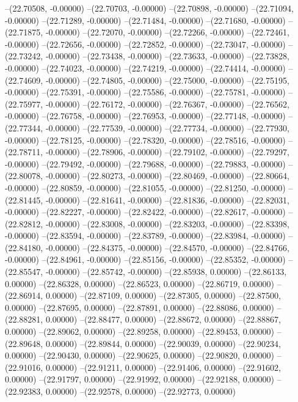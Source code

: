 --(22.70508, -0.00000)
--(22.70703, -0.00000)
--(22.70898, -0.00000)
--(22.71094, -0.00000)
--(22.71289, -0.00000)
--(22.71484, -0.00000)
--(22.71680, -0.00000)
--(22.71875, -0.00000)
--(22.72070, -0.00000)
--(22.72266, -0.00000)
--(22.72461, -0.00000)
--(22.72656, -0.00000)
--(22.72852, -0.00000)
--(22.73047, -0.00000)
--(22.73242, -0.00000)
--(22.73438, -0.00000)
--(22.73633, -0.00000)
--(22.73828, -0.00000)
--(22.74023, -0.00000)
--(22.74219, -0.00000)
--(22.74414, -0.00000)
--(22.74609, -0.00000)
--(22.74805, -0.00000)
--(22.75000, -0.00000)
--(22.75195, -0.00000)
--(22.75391, -0.00000)
--(22.75586, -0.00000)
--(22.75781, -0.00000)
--(22.75977, -0.00000)
--(22.76172, -0.00000)
--(22.76367, -0.00000)
--(22.76562, -0.00000)
--(22.76758, -0.00000)
--(22.76953, -0.00000)
--(22.77148, -0.00000)
--(22.77344, -0.00000)
--(22.77539, -0.00000)
--(22.77734, -0.00000)
--(22.77930, -0.00000)
--(22.78125, -0.00000)
--(22.78320, -0.00000)
--(22.78516, -0.00000)
--(22.78711, -0.00000)
--(22.78906, -0.00000)
--(22.79102, -0.00000)
--(22.79297, -0.00000)
--(22.79492, -0.00000)
--(22.79688, -0.00000)
--(22.79883, -0.00000)
--(22.80078, -0.00000)
--(22.80273, -0.00000)
--(22.80469, -0.00000)
--(22.80664, -0.00000)
--(22.80859, -0.00000)
--(22.81055, -0.00000)
--(22.81250, -0.00000)
--(22.81445, -0.00000)
--(22.81641, -0.00000)
--(22.81836, -0.00000)
--(22.82031, -0.00000)
--(22.82227, -0.00000)
--(22.82422, -0.00000)
--(22.82617, -0.00000)
--(22.82812, -0.00000)
--(22.83008, -0.00000)
--(22.83203, -0.00000)
--(22.83398, -0.00000)
--(22.83594, -0.00000)
--(22.83789, -0.00000)
--(22.83984, -0.00000)
--(22.84180, -0.00000)
--(22.84375, -0.00000)
--(22.84570, -0.00000)
--(22.84766, -0.00000)
--(22.84961, -0.00000)
--(22.85156, -0.00000)
--(22.85352, -0.00000)
--(22.85547, -0.00000)
--(22.85742, -0.00000)
--(22.85938, 0.00000)
--(22.86133, 0.00000)
--(22.86328, 0.00000)
--(22.86523, 0.00000)
--(22.86719, 0.00000)
--(22.86914, 0.00000)
--(22.87109, 0.00000)
--(22.87305, 0.00000)
--(22.87500, 0.00000)
--(22.87695, 0.00000)
--(22.87891, 0.00000)
--(22.88086, 0.00000)
--(22.88281, 0.00000)
--(22.88477, 0.00000)
--(22.88672, 0.00000)
--(22.88867, 0.00000)
--(22.89062, 0.00000)
--(22.89258, 0.00000)
--(22.89453, 0.00000)
--(22.89648, 0.00000)
--(22.89844, 0.00000)
--(22.90039, 0.00000)
--(22.90234, 0.00000)
--(22.90430, 0.00000)
--(22.90625, 0.00000)
--(22.90820, 0.00000)
--(22.91016, 0.00000)
--(22.91211, 0.00000)
--(22.91406, 0.00000)
--(22.91602, 0.00000)
--(22.91797, 0.00000)
--(22.91992, 0.00000)
--(22.92188, 0.00000)
--(22.92383, 0.00000)
--(22.92578, 0.00000)
--(22.92773, 0.00000)
